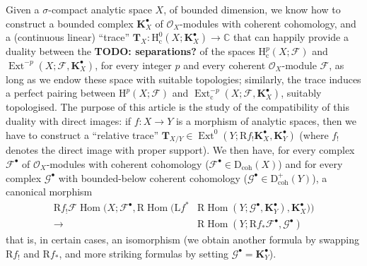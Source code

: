 \documentclass[british]{article}
\begin{document}
Given a \(\sigma\)-compact analytic space \(X\), of bounded dimension,
we know how to construct \autocite{10} a bounded complex
\(\mathbf{K}_X^\bullet\) of \({\mathscr{O}}_X\)-modules with coherent
cohomology, and a (continuous linear) ``trace''
\(\mathbf{T}_X\colon\mathrm{H}_\mathrm{c}^0(X;\mathbf{K}_X^\bullet)\to\mathbb{C}\)
that can happily provide a duality between the \textbf{TODO:
separations?} of the spaces \(\mathrm{H}_\mathrm{c}^p(X;{\mathscr{F}})\)
and \(\operatorname{Ext}^{-p}(X;{\mathscr{F}},\mathbf{K}_X^\bullet)\),
for every integer \(p\) and every coherent \({\mathscr{O}}_X\)-module
\({\mathscr{F}}\), as long as we endow these space with suitable
topologies; similarly, the trace induces a perfect pairing between
\(\mathrm{H}^p(X;{\mathscr{F}})\) and
\(\operatorname{Ext}_\mathrm{c}^{-p}(X;{\mathscr{F}},\mathbf{K}_X^\bullet)\),
suitably topologised. The purpose of this article is the study of the
compatibility of this duality with direct images: if \(f\colon X\to Y\)
is a morphism of analytic spaces, then we have to construct a ``relative
trace''
\(\mathbf{T}_{X/Y}\in\operatorname{Ext}^0(Y;\mathrm{R}f_!\mathbf{K}_X^\bullet,\mathbf{K}_Y^\bullet)\)
(where \(f_!\) denotes the direct image with proper support). We then
have, for every complex \({\mathscr{F}}^\bullet\) of
\({\mathscr{O}}_X\)-modules with coherent cohomology
(\({\mathscr{F}}^\bullet\in\mathrm{D}_\mathrm{coh}(X)\)) and for every
complex \({\mathscr{G}}^\bullet\) with bounded-below coherent cohomology
(\({\mathscr{G}}^\bullet\in\mathrm{D}_\mathrm{coh}^+(Y)\)), a canonical
morphism \[
  \begin{aligned}
    \mathrm{R}f_!{\mathscr{F}}\operatorname{Hom}\big(
      X ; {\mathscr{F}}^\bullet,
      \mathrm{R}\operatorname{Hom}(
        \mathrm{L}f^*&\mathrm{R}\operatorname{Hom}(
          Y;{\mathscr{G}}^\bullet,
          \mathbf{K}_Y^\bullet
        ),
        \mathbf{K}_X^\bullet)
    \big)
  \\\to\, &\mathrm{R}\operatorname{Hom}(Y;\mathrm{R}f_*{\mathscr{F}}^\bullet,{\mathscr{G}}^\bullet)
  \end{aligned}
\tag{1}
\] that is, in certain cases, an isomorphism (we obtain another formula
by swapping \(\mathrm{R}f_!\) and \(\mathrm{R}f_*\), and more striking
formulas by setting \({\mathscr{G}}^\bullet=\mathbf{K}_Y^\bullet\)).
\end{document}
